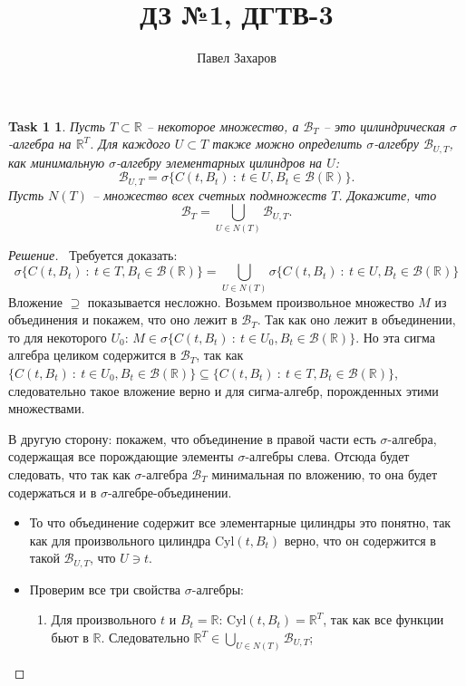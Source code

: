 \documentclass[12pt,a4paper]{extarticle}
\title{\Huge{ДЗ №1, ДГТВ-3}}
\author{Павел Захаров}
\date{}
\newtheorem*{task1}{Task 1}
\newcommand{\R}{\mathbb{R}}
\newcommand{\B}{\mathcal{B}}
\begin{document}
\maketitle

\begin{task1}
	Пусть $T \subset \R$ -- некоторое множество, а $\B_T$ -- это цилиндрическая $\sigma$-алгебра	на $\R^T$. Для каждого $U \subset T$ также можно определить $\sigma$-алгебру $\B_{U,T}$, как минимальную $\sigma$-алгебру элементарных цилиндров на $U$:
	\[
		\B_{U,T} = \sigma\{ C(t, B_t) ~:~ t \in U, B_t \in \B(\R) \}.
	\]
	Пусть $N(T)$ -- множество всех счетных подмножеств $T$. Докажите, что
	\[
		\B_T = \bigcup_{U \in N(T)} \B_{U,T}.
	\]
	
\end{task1}
\begin{proof}[Решение]
	\
	Требуется доказать:
	\[
		\sigma\{ C(t, B_t) ~:~ t \in T, B_t \in \B(\R) \} = \bigcup_{U \in N(T)} \sigma\{ C(t, B_t) ~:~ t \in U, B_t \in \B(\R) \}
	\]
	Вложение $\supseteq$ показывается несложно. Возьмем произвольное множество $M$ из объединения и покажем, что оно лежит в $\B_T$. Так как оно лежит в объединении, то для некоторого $U_0$: $M \in \sigma\{ C(t, B_t) ~:~ t \in U_0, B_t \in \B(\R) \}$. Но эта сигма алгебра целиком содержится в $\B_T$, так как $\{ C(t, B_t) ~:~ t \in U_0, B_t \in \B(\R) \} \subseteq \{ C(t, B_t) ~:~ t \in T, B_t \in \B(\R) \}$, следовательно такое вложение верно и для сигма-алгебр, порожденных этими множествами.
	
	\vspace{\baselineskip}
	В другую сторону: покажем, что объединение в правой части есть $\sigma$-алгебра, содержащая все порождающие элементы $\sigma$-алгебры слева. Отсюда будет следовать, что так как $\sigma$-алгебра $\B_T$ минимальная по вложению, то она будет содержаться и в $\sigma$-алгебре-объединении.
	
	\begin{itemize}
		\item То что объединение содержит все элементарные цилиндры это понятно, так как для произвольного цилиндра $\text{Cyl}(t, B_t)$ верно, что он содержится в такой $\B_{U,T}$, что $U \ni t$.
		
		\item Проверим все три свойства $\sigma$-алгебры:
		\begin{enumerate}
			\item Для произвольного $t$ и $B_t = \R$: $\text{Cyl}(t, B_t) = \R^T$, так как все функции бьют в $\R$. Следовательно $\R^T \in \bigcup_{U \in N(T)}\B_{U,T}$;
			

\end{enumerate}
\end{itemize}
\end{proof}
\end{document}

